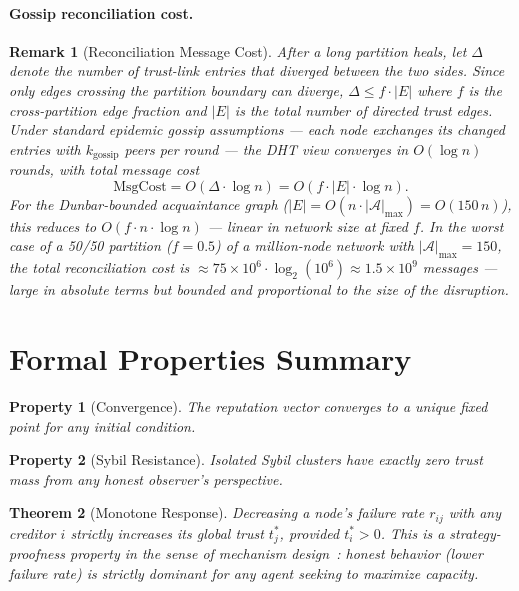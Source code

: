 \documentclass[11pt]{article}
\newtheorem{theorem}{Theorem}[section]
\newtheorem{remark}[theorem]{Remark}
\newtheorem{property}{Property}[section]
\begin{document}
\paragraph{Gossip reconciliation cost.}

\begin{remark}[Reconciliation Message Cost]\label{rem:gossip_cost}
After a long partition heals, let $\Delta$ denote the number of trust-link entries that diverged between the two sides. Since only edges crossing the partition boundary can diverge, $\Delta \leq f \cdot |E|$ where $f$ is the cross-partition edge fraction and $|E|$ is the total number of directed trust edges. Under standard epidemic gossip assumptions --- each node exchanges its changed entries with $k_{\text{gossip}}$ peers per round --- the DHT view converges in $O(\log n)$ rounds, with total message cost
\[
    \text{MsgCost} = O\!\left(\Delta \cdot \log n\right) = O\!\left(f \cdot |E| \cdot \log n\right).
\]
For the Dunbar-bounded acquaintance graph ($|E| = O(n \cdot |\mathcal{A}|_{\max}) = O(150\,n)$), this reduces to $O(f \cdot n \cdot \log n)$ --- linear in network size at fixed $f$. In the worst case of a 50/50 partition ($f = 0.5$) of a million-node network with $|\mathcal{A}|_{\max} = 150$, the total reconciliation cost is $\approx 75 \times 10^6 \cdot \log_2(10^6) \approx 1.5 \times 10^9$ messages --- large in absolute terms but bounded and proportional to the size of the disruption.
\end{remark}

\section{Formal Properties Summary}
\label{sec:properties}

\begin{property}[Convergence]
The reputation vector converges to a unique fixed point for any initial condition.
\end{property}

\begin{property}[Sybil Resistance]
Isolated Sybil clusters have exactly zero trust mass from any honest observer's perspective.
\end{property}

\begin{theorem}[Monotone Response]\label{thm:monotone_response}
Decreasing a node's failure rate $r_{ij}$ with any creditor $i$ strictly increases its global trust $t^*_j$, provided $t^*_i > 0$. This is a strategy-proofness property in the sense of mechanism design~\cite{nisan2007}: honest behavior (lower failure rate) is strictly dominant for any agent seeking to maximize capacity.
\end{theorem}
\end{document}
